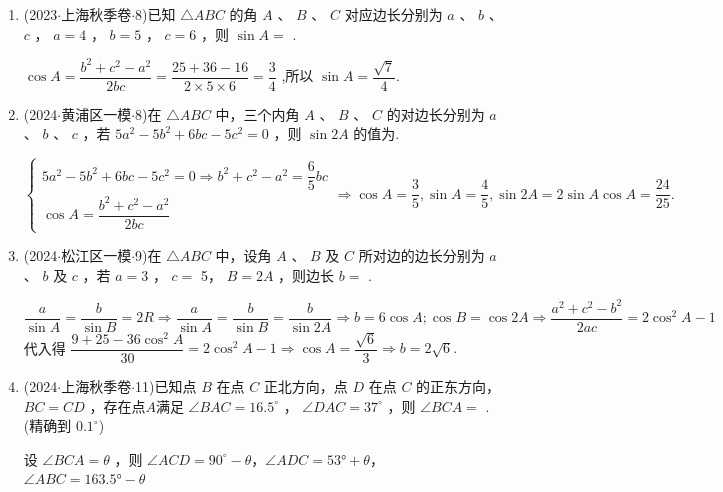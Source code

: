 \begin{enumerate}
    \item (2023$\cdot$上海秋季卷$\cdot$8)已知 $\bigtriangleup  {ABC}$ 的角 $A$ 、 $B$ 、 $C$ 对应边长分别为 $a$ 、 $b$ 、 $c$ ， $a = 4$ ， $b = 5$ ， $c = 6$ ，则 $\sin A =$ .
    \begin{jieda}
        $\cos A = \dfrac{{b}^{2} + {c}^{2} - {a}^{2}}{2bc} = \dfrac{{25} + {36} - {16}}{2 \times  5 \times  6} = \dfrac{3}{4}$ ,所以 $\sin A  = \dfrac{\sqrt{7}}{4}$.
    \end{jieda}

    \item (2024$\cdot$黄浦区一模$\cdot$8)在 $\bigtriangleup  {ABC}$ 中，三个内角 $A$ 、 $B$ 、 $C$ 的对边长分别为 $a$ 、 $b$ 、 $c$ ，若 $5{a}^{2} - 5{b}^{2} +  {6bc} - 5{c}^{2} = 0$ ，则 $\sin {2A}$ 的值为.
    \begin{jieda}
        $\left\{  {\begin{array}{l} 5{a}^{2} - 5{b}^{2} + {6bc} - 5{c}^{2} = 0 \Longrightarrow  {b}^{2} + {c}^{2} - {a}^{2} = \dfrac{6}{5}{bc} \\  \cos A = \dfrac{{b}^{2} + {c}^{2} - {a}^{2}}{2bc} \end{array} \Longrightarrow  }\right.  \cos A = \dfrac{3}{5},\sin A = \dfrac{4}{5},\sin {2A} = 2\sin A\cos A = \dfrac{24}{25}.$
    \end{jieda}

    \item (2024$\cdot$松江区一模$\cdot$9)在 $\bigtriangleup  {ABC}$ 中，设角 $A$ 、 $B$ 及 $C$ 所对边的边长分别为 $a$ 、 $b$ 及 $c$ ，若 $a = 3$ ， $c =$ 5， $B = {2A}$ ，则边长 $b =$ .
    \begin{jieda}
        $\dfrac{a}{\sin A} = \dfrac{b}{\sin B} = {2R} \Longrightarrow  \dfrac{a}{\sin A} = \dfrac{b}{\sin B} = \dfrac{b}{\sin {2A}} \Longrightarrow  b =  6\cos A;\cos B = \cos {2A} \Longrightarrow  \dfrac{{a}^{2} + {c}^{2} - {b}^{2}}{2ac} = 2{\cos }^{2}A - 1$ 代入得 $\dfrac{9 + {25} - {36}{\cos }^{2}A}{30} = 2{\cos }^{2}A - 1 \Longrightarrow  \cos A = \dfrac{\sqrt{6}}{3} \Longrightarrow  b = 2\sqrt{6}.$
    \end{jieda}

    \item (2024$\cdot$上海秋季卷$\cdot$11)已知点 $B$ 在点 $C$ 正北方向，点 $D$ 在点 $C$ 的正东方向， ${BC} = {CD}$ ，存在点$A$满足 $\angle {BAC} = {16.5}^{ \circ  }$ ， $\angle {DAC} = {37}^{ \circ  }$ ，则 $\angle {BCA} =$ .(精确到 ${0.1}^{ \circ  }$)
    \begin{jieda}
        设 $\angle {BCA} = \theta$ ，则 $\angle {ACD} = {90}^{\circ} - \theta$，$\angle ADC = \ang{53} + \theta$，$\angle ABC = \ang{163.5} - \theta$
        

\end{jieda}
\end{enumerate}
